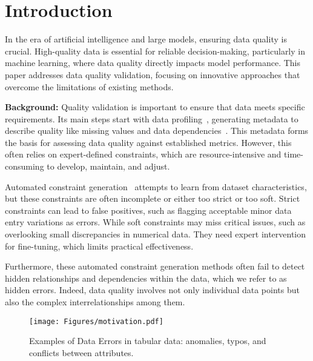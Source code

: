 \section{Introduction}
In the era of artificial intelligence and large models, ensuring data quality is crucial. High-quality data is essential for reliable decision-making, particularly in machine learning, where data quality directly impacts model performance. This paper addresses data quality validation, focusing on innovative approaches that overcome the limitations of existing methods.

\noindent\textbf{Background:}  
Quality validation is important to ensure that data meets specific requirements. Its main steps start
with data profiling~\cite{abedjan2017data}, generating metadata to describe quality like missing values and data dependencies~\cite{maydan1991efficient,naumann2014data}. 
This metadata forms the basis for assessing data quality against established metrics. 
However, this often relies on expert-defined constraints, which are resource-intensive and time-consuming to develop, maintain, and adjust.

Automated constraint generation~\cite{schelter2018automating,caveness2020tensorflow} attempts to learn from dataset characteristics, but these constraints are often incomplete or either too strict or too soft.
Strict constraints can lead to false positives, such as flagging acceptable minor data entry variations as errors. While soft 
constraints may miss critical issues, such as overlooking small discrepancies in numerical data. They need expert intervention for fine-tuning, which limits practical effectiveness.

Furthermore, these automated constraint generation methods often fail to detect hidden 
relationships and dependencies within the data, which we refer to as hidden errors. 
Indeed, data quality involves not only individual data points but also the complex interrelationships among them. 

\begin{figure}[tb]
\centering
\texttt{[image: Figures/motivation.pdf]}
\caption{Examples of Data Errors in tabular data: anomalies, typos, and conflicts between attributes.}
\label{fig:motivation}
\end{figure}

